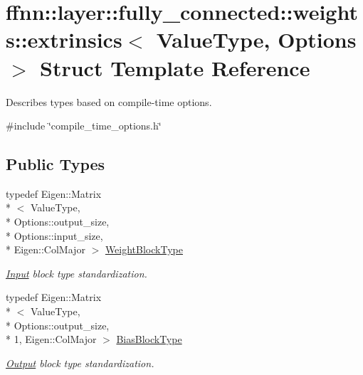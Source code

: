 \hypertarget{structffnn_1_1layer_1_1fully__connected_1_1weights_1_1extrinsics}{\section{ffnn\-:\-:layer\-:\-:fully\-\_\-connected\-:\-:weights\-:\-:extrinsics$<$ Value\-Type, Options $>$ Struct Template Reference}
\label{structffnn_1_1layer_1_1fully__connected_1_1weights_1_1extrinsics}
}


Describes types based on compile-\/time options.  




{\ttfamily \#include \char`\"{}compile\-\_\-time\-\_\-options.\-h\char`\"{}}

\subsection*{Public Types}
\begin{DoxyCompactItemize}
\item 
typedef Eigen\-::\-Matrix\\*
$<$ Value\-Type, \\*
Options\-::output\-\_\-size, \\*
Options\-::input\-\_\-size, \\*
Eigen\-::\-Col\-Major $>$ \hyperlink{structffnn_1_1layer_1_1fully__connected_1_1weights_1_1extrinsics_a0c2c0299f0112bdcbcc72f9cf7af9bf6}{Weight\-Block\-Type}
\begin{DoxyCompactList}\small\item\em \hyperlink{classffnn_1_1layer_1_1_input}{Input} block type standardization. \end{DoxyCompactList}\item 
typedef Eigen\-::\-Matrix\\*
$<$ Value\-Type, \\*
Options\-::output\-\_\-size, \\*
1, Eigen\-::\-Col\-Major $>$ \hyperlink{structffnn_1_1layer_1_1fully__connected_1_1weights_1_1extrinsics_a7ea91263929a2b1b067b8c77a37f92a4}{Bias\-Block\-Type}
\begin{DoxyCompactList}\small\item\em \hyperlink{classffnn_1_1layer_1_1_output}{Output} block type standardization. \end{DoxyCompactList}\end{DoxyCompactItemize}


